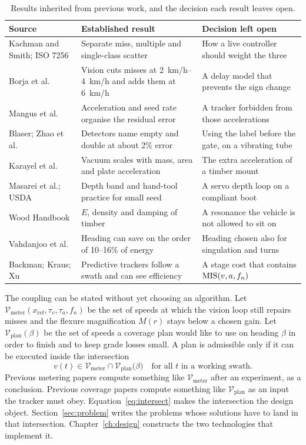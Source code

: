 \begin{table}[ht]
\centering
\caption{Results inherited from previous work, and the decision each result leaves open.}
\label{tab:gaps}
\small
\begin{tabularx}{\textwidth}{@{}lX X@{}}
\toprule
Source & Established result & Decision left open \\
\midrule
Kachman and Smith; ISO 7256 & Separate miss, multiple and single-class scatter & How a live controller should weight the three \\
Borja et al. & Vision cuts misses at \SIrange{2}{4}{km/h} and adds them at \SI{6}{km/h} & A delay model that prevents the sign change \\
Mangus et al. & Acceleration and seed rate organise the residual error & A tracker forbidden from those accelerations \\
Blaser; Zhao et al. & Detectors name empty and double at about \num{2}\% error & Using the label before the gate, on a vibrating tube \\
Karayel et al. & Vacuum scales with mass, area and plate acceleration & The extra acceleration of a timber mount \\
Masarei et al.; USDA & Depth band and hand-tool practice for small seed & A servo depth loop on a compliant boot \\
Wood Handbook & \(E\), density and damping of timber & A resonance the vehicle is not allowed to sit on \\
Vahdanjoo et al. & Heading can save on the order of \numrange{10}{16}\% of energy & Heading chosen also for singulation and turns \\
Backman; Kraus; Xu & Predictive trackers follow a swath and can see efficiency & A stage cost that contains \(\mathrm{MIS}(v,a,f_n)\) \\
\bottomrule
\end{tabularx}
\end{table}

The coupling can be stated without yet choosing an algorithm. Let \(\mathcal{V}_{\mathrm{meter}}(x_{\mathrm{ref}},\tau_v,\tau_a,f_n)\) be the set of speeds at which the vision loop still repairs misses and the flexure magnification \(M(r)\) stays below a chosen gain. Let \(\mathcal{V}_{\mathrm{plan}}(\beta)\) be the set of speeds a coverage plan would like to use on heading \(\beta\) in order to finish and to keep grade losses small. A plan is admissible only if it can be executed inside the intersection
\begin{equation}
\label{eq:intersect}
v(t) \in \mathcal{V}_{\mathrm{meter}} \cap \mathcal{V}_{\mathrm{plan}}\bigl(\beta\bigr)
\quad\text{for all } t \text{ in a working swath.}
\end{equation}
Previous metering papers compute something like \(\mathcal{V}_{\mathrm{meter}}\) after an experiment, as a conclusion. Previous coverage papers compute something like \(\mathcal{V}_{\mathrm{plan}}\) as an input the tracker must obey. Equation~\eqref{eq:intersect} makes the intersection the design object. Section~\ref{sec:problem} writes the problems whose solutions have to land in that intersection. Chapter~\ref{ch:design} constructs the two technologies that implement it.

